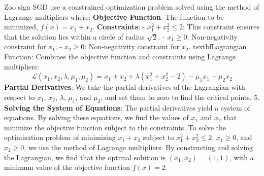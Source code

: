 Zoo sign SGD use a constrained optimization problem solved using the method of Lagrange multipliers where:
\textbf{Objective Function}: The function to be minimized, \( f(x) = x_1 + x_2 \).
\textbf{Constraints}:
    - \( x_1^2 + x_2^2 \leq 2 \): This constraint ensures that the solution lies within a circle of radius \(\sqrt{2}\).
    - \( x_1 \geq 0 \): Non-negativity constraint for \( x_1 \).
    - \( x_2 \geq 0 \): Non-negativity constraint for \( x_2 \).
textbf{Lagrangian Function}: Combines the objective function and constraints using Lagrange multipliers:
    \[
    \mathcal{L}(x_1, x_2, \lambda, \mu_1, \mu_2) = x_1 + x_2 + \lambda (x_1^2 + x_2^2 - 2) - \mu_1 x_1 - \mu_2 x_2
    \]
\textbf{Partial Derivatives}: We take the partial derivatives of the Lagrangian with respect to \( x_1 \), \( x_2 \), \( \lambda \), \( \mu_1 \), and \( \mu_2 \), and set them to zero to find the critical points.
5. \textbf{Solving the System of Equations}: The partial derivatives yield a system of equations. By solving these equations, we find the values of \( x_1 \) and \( x_2 \) that minimize the objective function subject to the constraints. To solve the optimization problem of minimizing \( x_1 + x_2 \) subject to \( x_1^2 + x_2^2 \leq 2 \), \( x_1 \geq 0 \), and \( x_2 \geq 0 \), we use the method of Lagrange multipliers. By constructing and solving the Lagrangian, we find that the optimal solution is \( (x_1, x_2) = (1, 1) \), with a minimum value of the objective function \( f(x) = 2 \).

